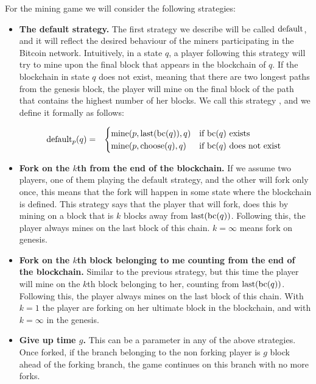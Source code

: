For the mining game we will consider the following strategies:
\begin{itemize}
\item {\bf The default strategy.}  The first strategy we describe will be called $\text{default}$, and it will reflect the desired behaviour of the miners participating in the Bitcoin network. Intuitively, in a state $q$, a player following this strategy will try to mine upon the final block that appears in the blockchain of $q$. If the blockchain in state $q$ does not exist, meaning that there are two longest paths from the genesis block, the player will mine on the final block of the path that contains the highest number of her blocks. We call this strategy \df, and we define it formally as follows:

\begin{eqnarray*}
\text{default}_p(q) & = &
\begin{cases}
\text{mine}(p,\text{last}(\text{bc}(q)),q) & \text{if } \text{bc}(q) \text{ exists }\\
\text{mine}(p,\text{choose}(q),q) & \text{if } \text{bc}(q) \text{ does not exist }
\end{cases}
\end{eqnarray*}


\item {\bf Fork on the $k$th from the end of the blockchain.} If we assume two players, one of them playing the default strategy, and the other will fork only once, this means that the fork will happen in some state where the blockchain is defined. This strategy says that the player that will fork, does this by mining on a block that is $k$ blocks away from $\text{last}(\text{bc}(q))$. Following this, the player always mines on the last block of this chain. $k=\infty$ means fork on genesis. 

\item {\bf Fork on the $k$th block belonging to me counting from the end of the blockchain.} Similar to the previous strategy, but this time the player will mine on the $k$th block belonging to her, counting from $\text{last}(\text{bc}(q))$. Following this, the player always mines on the last block of this chain. With $k=1$ the player are forking on her ultimate block in the blockchain, and with $k=\infty$ in the genesis.

\item {\bf Give up time $g$.} This can be a parameter in any of the above strategies. Once forked, if the branch belonging to the non forking player is $g$ block ahead of the forking branch, the game continues on this branch with no more forks.
\end{itemize}




